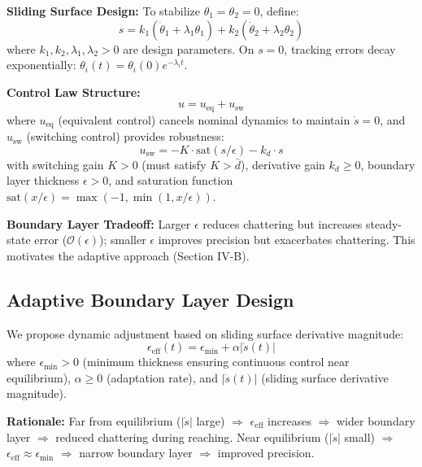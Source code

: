 \documentclass[conference]{IEEEtran}
\begin{document}
\textbf{Sliding Surface Design:} To stabilize $\theta_1 = \theta_2 = 0$, define:
\begin{equation}
s = k_1(\dot{\theta}_1 + \lambda_1\theta_1) + k_2(\dot{\theta}_2 + \lambda_2\theta_2)
\end{equation}
where $k_1, k_2, \lambda_1, \lambda_2 > 0$ are design parameters. On $s=0$, tracking errors decay exponentially: $\theta_i(t) = \theta_i(0)e^{-\lambda_i t}$.

\textbf{Control Law Structure:}
\begin{equation}
u = u_{\text{eq}} + u_{\text{sw}}
\end{equation}
where $u_{\text{eq}}$ (equivalent control) cancels nominal dynamics to maintain $\dot{s} = 0$, and $u_{\text{sw}}$ (switching control) provides robustness:
\begin{equation}
u_{\text{sw}} = -K \cdot \text{sat}(s/\epsilon) - k_d \cdot s
\end{equation}
with switching gain $K > 0$ (must satisfy $K > \bar{d}$), derivative gain $k_d \geq 0$, boundary layer thickness $\epsilon > 0$, and saturation function $\text{sat}(x/\epsilon) = \max(-1, \min(1, x/\epsilon))$.

\textbf{Boundary Layer Tradeoff:} Larger $\epsilon$ reduces chattering but increases steady-state error ($\mathcal{O}(\epsilon)$); smaller $\epsilon$ improves precision but exacerbates chattering. This motivates the adaptive approach (Section IV-B).

\subsection{Adaptive Boundary Layer Design}

We propose dynamic adjustment based on sliding surface derivative magnitude:
\begin{equation}
\epsilon_{\text{eff}}(t) = \epsilon_{\min} + \alpha |\dot{s}(t)|
\label{eq:adaptive_boundary}
\end{equation}
where $\epsilon_{\min} > 0$ (minimum thickness ensuring continuous control near equilibrium), $\alpha \geq 0$ (adaptation rate), and $|\dot{s}(t)|$ (sliding surface derivative magnitude).

\textbf{Rationale:} Far from equilibrium ($|\dot{s}|$ large) $\Rightarrow$ $\epsilon_{\text{eff}}$ increases $\Rightarrow$ wider boundary layer $\Rightarrow$ reduced chattering during reaching. Near equilibrium ($|\dot{s}|$ small) $\Rightarrow$ $\epsilon_{\text{eff}} \approx \epsilon_{\min}$ $\Rightarrow$ narrow boundary layer $\Rightarrow$ improved precision.
\end{document}
